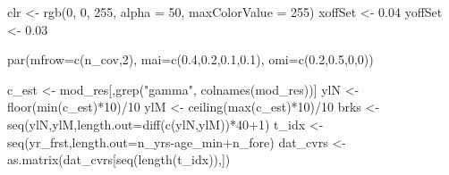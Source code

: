 \documentclass[11pt,]{article}
\newenvironment{Shaded}{}{}
\newcommand{\DataTypeTok}[1]{#1}
\newcommand{\DecValTok}[1]{#1}
\newcommand{\FloatTok}[1]{#1}
\newcommand{\KeywordTok}[1]{\textcolor[rgb]{0.00,0.00,1.00}{#1}}
\newcommand{\NormalTok}[1]{#1}
\newcommand{\OperatorTok}[1]{#1}
\newcommand{\StringTok}[1]{\textcolor[rgb]{0.00,0.50,0.50}{#1}}
\begin{document}
\begin{Shaded}
\begin{Highlighting}[]
\NormalTok{clr <-}\StringTok{ }\KeywordTok{rgb}\NormalTok{(}\DecValTok{0}\NormalTok{, }\DecValTok{0}\NormalTok{, }\DecValTok{255}\NormalTok{, }\DataTypeTok{alpha =} \DecValTok{50}\NormalTok{, }\DataTypeTok{maxColorValue =} \DecValTok{255}\NormalTok{)}
\NormalTok{xoffSet <-}\StringTok{ }\FloatTok{0.04}
\NormalTok{yoffSet <-}\StringTok{ }\FloatTok{0.03}

\KeywordTok{par}\NormalTok{(}\DataTypeTok{mfrow=}\KeywordTok{c}\NormalTok{(n_cov,}\DecValTok{2}\NormalTok{), }\DataTypeTok{mai=}\KeywordTok{c}\NormalTok{(}\FloatTok{0.4}\NormalTok{,}\FloatTok{0.2}\NormalTok{,}\FloatTok{0.1}\NormalTok{,}\FloatTok{0.1}\NormalTok{), }\DataTypeTok{omi=}\KeywordTok{c}\NormalTok{(}\FloatTok{0.2}\NormalTok{,}\FloatTok{0.5}\NormalTok{,}\DecValTok{0}\NormalTok{,}\DecValTok{0}\NormalTok{))}

\NormalTok{c_est <-}\StringTok{ }\NormalTok{mod_res[,}\KeywordTok{grep}\NormalTok{(}\StringTok{"gamma"}\NormalTok{, }\KeywordTok{colnames}\NormalTok{(mod_res))]}
\NormalTok{ylN <-}\StringTok{ }\KeywordTok{floor}\NormalTok{(}\KeywordTok{min}\NormalTok{(c_est)}\OperatorTok{*}\DecValTok{10}\NormalTok{)}\OperatorTok{/}\DecValTok{10}
\NormalTok{ylM <-}\StringTok{ }\KeywordTok{ceiling}\NormalTok{(}\KeywordTok{max}\NormalTok{(c_est)}\OperatorTok{*}\DecValTok{10}\NormalTok{)}\OperatorTok{/}\DecValTok{10}
\NormalTok{brks <-}\StringTok{ }\KeywordTok{seq}\NormalTok{(ylN,ylM,}\DataTypeTok{length.out=}\KeywordTok{diff}\NormalTok{(}\KeywordTok{c}\NormalTok{(ylN,ylM))}\OperatorTok{*}\DecValTok{40}\OperatorTok{+}\DecValTok{1}\NormalTok{)}
\NormalTok{t_idx <-}\StringTok{ }\KeywordTok{seq}\NormalTok{(yr_frst,}\DataTypeTok{length.out=}\NormalTok{n_yrs}\OperatorTok{-}\NormalTok{age_min}\OperatorTok{+}\NormalTok{n_fore)}
\NormalTok{dat_cvrs <-}\StringTok{ }\KeywordTok{as.matrix}\NormalTok{(dat_cvrs[}\KeywordTok{seq}\NormalTok{(}\KeywordTok{length}\NormalTok{(t_idx)),])}


\end{Highlighting}
\end{Shaded}
\end{document}
